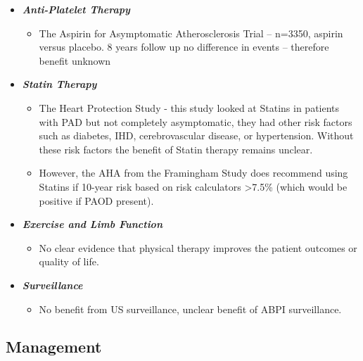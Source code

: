 \documentclass[
]{book}
\providecommand{\tightlist}{%
  \setlength{\itemsep}{0pt}\setlength{\parskip}{0pt}}
\begin{document}
\begin{itemize}
\item
  \textbf{\emph{Anti-Platelet Therapy}}

  \begin{itemize}
  \tightlist
  \item
    The Aspirin for Asymptomatic Atherosclerosis Trial -- n=3350,
    aspirin versus placebo. 8 years follow up no difference in
    events \citep{fowkesAspirinPreventionCardiovascular2010} -- therefore
    benefit unknown
  \end{itemize}
\item
  \textbf{\emph{Statin Therapy}}

  \begin{itemize}
  \item
    The Heart Protection Study
    \citep{heartprotectionstudycollaborativegroupRandomizedTrialEffects2007} -
    this study looked at Statins in patients with PAD but not
    completely asymptomatic, they had other risk factors such as
    diabetes, IHD, cerebrovascular disease, or hypertension. Without these
    risk factors the benefit of Statin therapy remains unclear.
  \item
    However, the AHA from the Framingham Study does recommend using
    Statins if 10-year risk based on risk calculators \textgreater7.5\% (which
    would be positive if PAOD present).
  \end{itemize}
\item
  \textbf{\emph{Exercise and Limb Function}}

  \begin{itemize}
  \tightlist
  \item
    No clear evidence that physical therapy improves the patient
    outcomes or quality of life.
  \end{itemize}
\item
  \textbf{\emph{Surveillance}}

  \begin{itemize}
  \tightlist
  \item
    No benefit from US surveillance, unclear benefit of ABPI
    surveillance.
  \end{itemize}
\end{itemize}

\hypertarget{management-17}{%
\subsection{Management}\label{management-17}}
\end{document}
